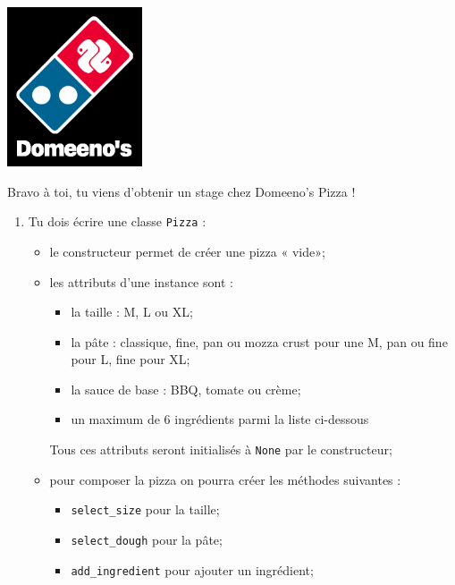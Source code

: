 \documentclass[a4paper,10pt,cours,firamath]{nsi}
\begin{document}
\begin{exercice}
    \begin{center}
        \includegraphics[width=4cm]{img/domeeno}
    \end{center}
    Bravo à toi, tu viens d'obtenir un stage chez Domeeno's Pizza ! 
    
    \begin{enumerate}
        \item     Tu dois écrire une classe \texttt{Pizza} :
              \begin{itemize}
                  \item     le constructeur permet de créer une pizza « vide»;
                  \item     les attributs d'une instance sont :
                        \begin{itemize}
                            \item     la taille : M, L ou XL;
                            \item     la pâte : classique, fine, pan ou mozza crust pour une M, pan ou fine pour L, fine pour XL;
                            \item     la sauce de base : BBQ, tomate ou crème;
                            \item     un maximum de 6 ingrédients parmi la liste ci-dessous
                        \end{itemize}
                        Tous ces attributs seront initialisés à \texttt{None} par le constructeur;
                  \item pour composer la pizza on pourra créer les méthodes suivantes :
                        \begin{itemize}
                            \item     \texttt{select_size} pour la taille;
                            \item     \texttt{select_dough} pour la pâte;
                            \item     \texttt{add_ingredient} pour ajouter un ingrédient;

\end{itemize}
\end{itemize}
\end{enumerate}
\end{exercice}
\end{document}

